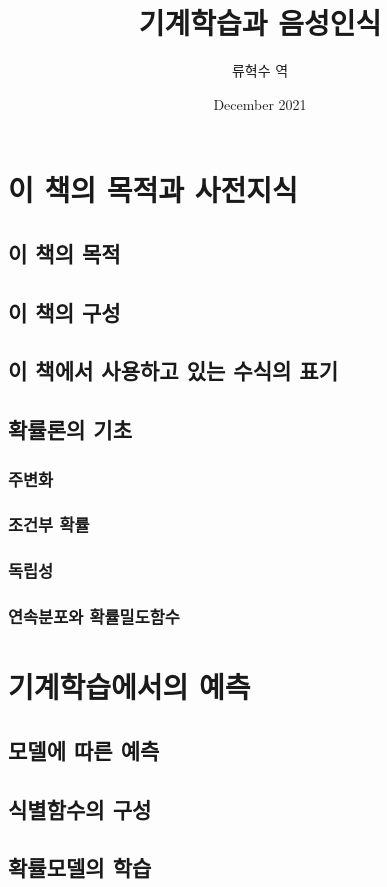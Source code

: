 \documentclass{book}
\title{기계학습과 음성인식}
\author{류혁수 역}
\date{December 2021}
\begin{document}
\maketitle
\tableofcontents

\chapter{이 책의 목적과 사전지식}
\section{이 책의 목적}
\section{이 책의 구성}
\section{이 책에서 사용하고 있는 수식의 표기}
\section{확률론의 기초}
\subsection{주변화}
\subsection{조건부 확률}
\subsection{독립성}
\subsection{연속분포와 확률밀도함수}

\chapter{기계학습에서의 예측}
\section{모델에 따른 예측}
\section{식별함수의 구성}
\section{확률모델의 학습}
\end{document}
